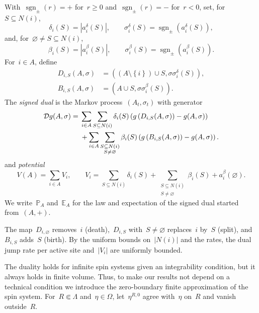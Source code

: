 \documentclass[EJP,preprint,NODS,nobera]{ejpecp}
\newcommand{\pP}{\mathbb{P}}
\newcommand{\E}{\mathbb{E}}
\newcommand{\bb}[1]{\left(#1\right)}
\newcommand{\cb}[1]{\left\{#1\right\}}
\newcommand{\abs}[1]{\left|#1\right|}
\newcommand{\Dcal}{\mathcal{D}}
\begin{document}
\begin{definition}
\label{def:signed-dual}
With~$\operatorname{sgn}_{\pm}(r)=+$ for~$r\geq0$
and~$\operatorname{sgn}_{\pm}(r)=-$ for~$r<0$, set, for~$S\subseteq N(i)$,
\begin{equation}
\label{eq:death-split-data}
\delta_i(S)
=
\abs{a_i^\delta(S)},
\qquad
\sigma_i^\delta(S)
=
\operatorname{sgn}_{\pm}\bb{a_i^\delta(S)},
\end{equation}
and, for~$\varnothing\neq S\subseteq N(i)$,
\begin{equation}
\label{eq:birth-data}
\beta_i(S)
=
\abs{a_i^\beta(S)},
\qquad
\sigma_i^\beta(S)
=
\operatorname{sgn}_{\pm}\bb{a_i^\beta(S)}.
\end{equation}
For~$i\in A$, define
\begin{align*}
D_{i,S}(A,\sigma)
&=
\bb{
\bb{A\setminus\cb{i}}\cup S,
\sigma\sigma_i^\delta(S)
},
\\
B_{i,S}(A,\sigma)
&=
\bb{
A\cup S,
\sigma\sigma_i^\beta(S)
}.
\end{align*}
The \emph{signed dual} is the Markov process~$(A_t,\sigma_t)$ with generator
\begin{align}
\label{eq:signed-dual-generator}
\Dcal g(A,\sigma)
={}&
\sum_{i\in A}\sum_{S\subseteq N(i)}
\delta_i(S)
\bb{
g\bb{D_{i,S}(A,\sigma)}-g(A,\sigma)
}
\notag\\
&+
\sum_{i\in A}
\sum_{\substack{S\subseteq N(i)\\S\neq\varnothing}}
\beta_i(S)
\bb{
g\bb{B_{i,S}(A,\sigma)}-g(A,\sigma)
}.
\end{align}
and \emph{potential}
\begin{equation}
\label{eq:dual-potential}
V(A)
=
\sum_{i\in A}V_i,
\qquad
V_i
=
\sum_{S\subseteq N(i)}\delta_i(S)
+
\sum_{\substack{S\subseteq N(i)\\S\neq\varnothing}}\beta_i(S)
+
a_i^\beta(\varnothing).
\end{equation}
We write~$\pP_A$ and~$\E_A$ for the law and expectation of the signed dual
started from~$(A,+)$.
\end{definition}

\begin{remark}
The map~$D_{i,\varnothing}$ removes~$i$ (death),~$D_{i,S}$
with~$S\neq\varnothing$ replaces~$i$ by~$S$ (split), and~$B_{i,S}$ adds~$S$
(birth). By the uniform bounds on~$\abs{N(i)}$ and the rates, the dual jump
rate per active site and~$\abs{V_i}$ are uniformly bounded.
\end{remark}

The duality holds for infinite spin systems given an integrability condition, but it always holds in finite volume. Thus, to make our results not depend on a technical condition we introduce the zero-boundary finite approximation of the spin system. For~$R\Subset\Lambda$
and~$\eta\in\Omega$, let~$\eta^{R,0}$ agree with~$\eta$ on~$R$ and vanish
outside~$R$.
\end{document}
